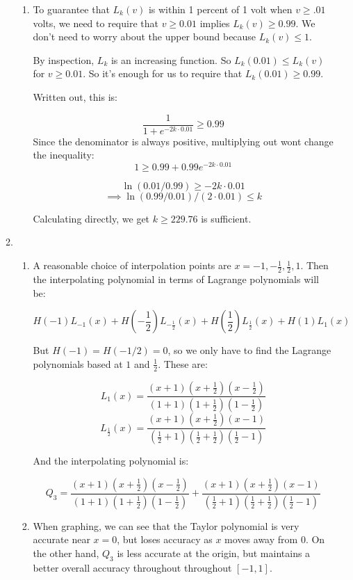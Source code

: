 \begin{enumerate}
\begin{enumerate}
\begin{enumerate}
                \item To guarantee that $L_k(v)$ is within 1 percent of 1 volt when $v \geq .01$ volts, we need to require that $v\geq 0.01 $ implies $L_k(v)\geq 0.99$. We don't need to worry about the upper bound because $L_k(v) \leq 1$. 

                By inspection, $L_k$ is an increasing function. So $L_k(0.01)\leq L_k(v)$ for $v \geq 0.01$. So it's enough for us to require that $L_k(0.01)\geq 0.99$.

                Written out, this is:

                \[\frac{1}{1+e^{-2k\cdot 0.01}} \geq 0.99\]
                Since the denominator is always positive, multiplying out wont change the inequality:
                \[1 \geq 0.99 + 0.99 e^{-2k \cdot 0.01}\]

                \[\ln(0.01/0.99) \geq -2k\cdot 0.01\]
                \[\implies \ln(0.99/0.01)/(2\cdot 0.01)\leq k\]

                Calculating directly, we get $k\geq 229.76$ is sufficient. 
                
                \end{enumerate}
            \item 
            \begin{enumerate} 
            \item A reasonable choice of interpolation points are $x = -1,-\frac{1}{2},\frac{1}{2},1$. Then the interpolating polynomial in terms of Lagrange polynomials will be:

            \[H(-1)L_{-1}(x) + H(-\frac{1}{2})L_{-\frac{1}{2}}(x) + H(\frac{1}{2})L_{\frac{1}{2}}(x) + H(1)L_1(x)\]

            But $H(-1) = H(-1/2) = 0$, so we only have to find the Lagrange polynomials based at $1$ and $\frac{1}{2}$. These are:

            \[L_1(x)=\frac{(x+1)(x+\frac{1}{2})(x-\frac{1}{2})}{(1+1)(1+\frac{1}{2})(1-\frac{1}{2})}\]
            \[L_{\frac{1}{2}}(x) = \frac{(x+1)(x+\frac{1}{2})(x-1)}{(\frac{1}{2}+1)(\frac{1}{2}+\frac{1}{2})(\frac{1}{2}-1)}\]

            And the interpolating polynomial is:

            \[Q_3 = \frac{(x+1)(x+\frac{1}{2})(x-\frac{1}{2})}{(1+1)(1+\frac{1}{2})(1-\frac{1}{2})} +\frac{(x+1)(x+\frac{1}{2})(x-1)}{(\frac{1}{2}+1)(\frac{1}{2}+\frac{1}{2})(\frac{1}{2}-1)}\]

            \item When graphing, we can see that the Taylor polynomial is very accurate near $x=0$, but loses accuracy as $x$ moves away from $0$. On the other hand, $Q_3$ is less accurate at the origin, but maintains a better overall accuracy throughout throughout $[-1,1]$.  


\end{enumerate}
\end{enumerate}
\end{enumerate}

